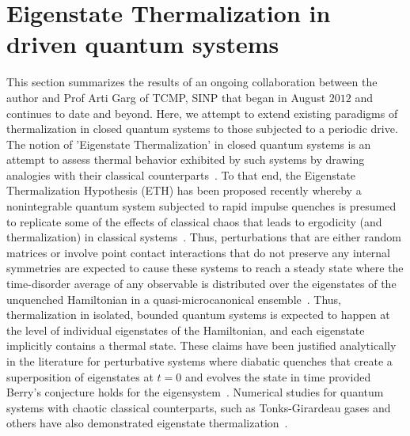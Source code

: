 \documentclass[a4paper,10pt]{report}
\begin{document}
\section{\sc Eigenstate Thermalization in driven quantum systems}
\label{sec:etherm}
This section summarizes the results of an ongoing collaboration between the author and Prof Arti Garg of TCMP, SINP that began in August $2012$ and continues to date and beyond. Here, we attempt to extend existing paradigms of thermalization in closed quantum systems to those subjected to a periodic drive. The notion of 'Eigenstate Thermalization' in closed quantum systems is an attempt to assess thermal behavior exhibited by such systems by drawing analogies with their classical counterparts\ \cite{rigol:nature}. To that end, the Eigenstate Thermalization Hypothesis (ETH) has been proposed recently whereby a nonintegrable quantum system subjected to rapid impulse quenches is presumed to replicate some of the effects of classical chaos that leads to ergodicity (and thermalization) in classical systems\ \cite{rigol:nature, deutsch, olshanii:ipr, krishnenduda:ethreview}. Thus, perturbations that are either random matrices or involve point contact interactions that do not preserve any internal symmetries are 
expected to cause these systems to reach a steady state where the time-disorder average of any observable is distributed over the eigenstates of the unquenched Hamiltonian in a quasi-microcanonical ensemble~\cite{deutsch,olshanii:ipr}. Thus, thermalization in isolated, bounded quantum systems is expected to happen at the level of individual eigenstates of the Hamiltonian, and each eigenstate implicitly contains a thermal state. These claims have been justified analytically in the literature for perturbative systems where diabatic quenches that create a superposition of eigenstates at $t=0$ and evolves the state in time provided Berry's conjecture holds for the eigensystem~\cite{deutsch,olshanii:ipr}. Numerical studies for quantum systems with chaotic classical counterparts, such as Tonks-Girardeau gases and others have also demonstrated eigenstate thermalization~\cite{rigol:nature}.
\end{document}
